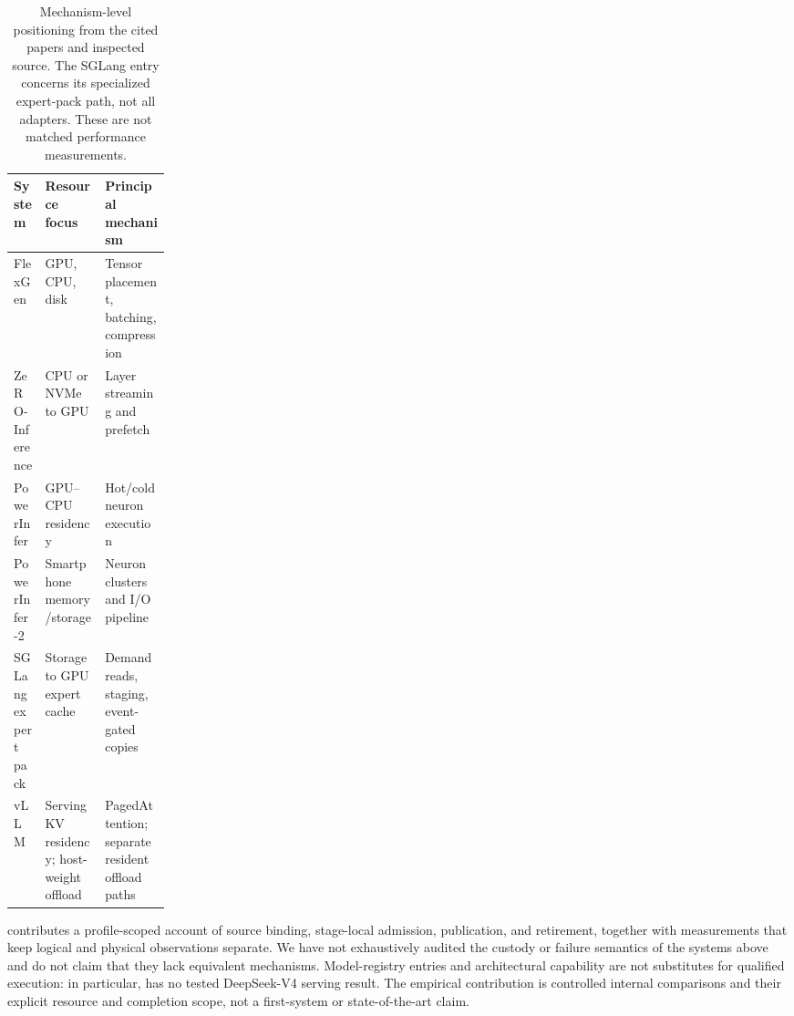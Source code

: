 \begin{table}[!htbp]
\centering
\small
\begin{tabularx}{\linewidth}{@{}>{\raggedright\arraybackslash}p{0.20\linewidth}>{\raggedright\arraybackslash}X>{\raggedright\arraybackslash}X@{}}
\toprule
System & Resource focus & Principal mechanism \\
\midrule
FlexGen & GPU, CPU, disk & Tensor placement, batching, compression \\
ZeRO-Inference & CPU or NVMe to GPU & Layer streaming and prefetch \\
PowerInfer & GPU--CPU residency & Hot/cold neuron execution \\
PowerInfer-2 & Smartphone memory/storage & Neuron clusters and I/O pipeline \\
SGLang expert pack & Storage to GPU expert cache & Demand reads, staging, event-gated copies \\
vLLM & Serving KV residency; host-weight offload & PagedAttention; separate resident offload paths \\
\bottomrule
\end{tabularx}
\caption{Mechanism-level positioning from the cited papers and inspected source.
The SGLang entry concerns its specialized expert-pack path, not all adapters.
These are not matched performance measurements.}
\label{tab:prior-work}
\end{table}

\system{} contributes a profile-scoped account of source binding, stage-local
admission, publication, and retirement, together with measurements that keep
logical and physical observations separate. We have not exhaustively audited
the custody or failure semantics of the systems above and do not claim that
they lack equivalent mechanisms. Model-registry entries and architectural
capability are not substitutes for qualified execution: in particular,
\system{} has no tested DeepSeek-V4 serving result. The empirical contribution
is controlled internal comparisons and their explicit resource and completion
scope, not a first-system or state-of-the-art claim.

